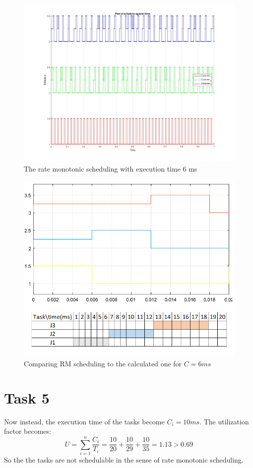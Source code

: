 \documentclass[a4paper,12pt,oneside,onecolumn]{article} %
\begin{document}
\begin{figure}[H]
    \centering
    \includegraphics[scale=0.3]{schedule06.jpg}
    \caption{The rate monotonic scheduling with execution time 6 ms}
    \label{fig:3}
\end{figure}

\begin{figure}[H]
    \centering
    \includegraphics[scale=1]{Task_4.png}
    \caption{Comparing RM scheduling to the calculated one for $C=6ms$}
    \label{fig:4}
\end{figure}


\section*{Task 5}
Now instead, the execution time of the tasks become $C_i = 10 ms$. The utilization factor becomes: 
\begin{equation}
U = \sum_{i=1}^n \frac{C_i}{T_i} = \frac{10}{20} + \frac{10}{29} + \frac{10}{35} = 1.13 > 0.69
\end{equation}
So the the tasks are not schedulable in the sense of rate monotonic scheduling. 
\end{document}
